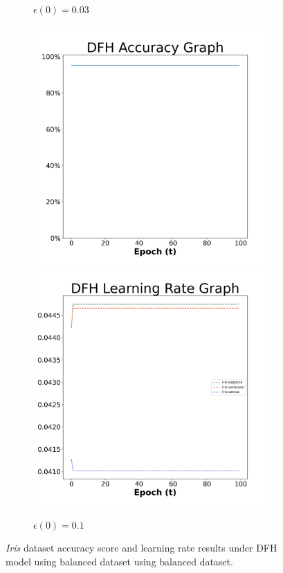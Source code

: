 \begin{figure}[H]
\begin{subfigure}{0.3\textwidth}
  \caption{$\epsilon(0)=0.03$}
\end{subfigure}\hfil %
\begin{subfigure}{0.3\textwidth}
  \includegraphics[width=\linewidth]{images/exper1/iris/DFH_0.1_acc.png}
  \includegraphics[width=\linewidth]{images/exper1/iris/DFH_0.1_lr.png}
  \caption{$\epsilon(0)=0.1$}
\end{subfigure}

\caption{\textit{Iris} dataset accuracy score and learning rate results under DFH model using balanced dataset using balanced dataset.}
\end{figure}

